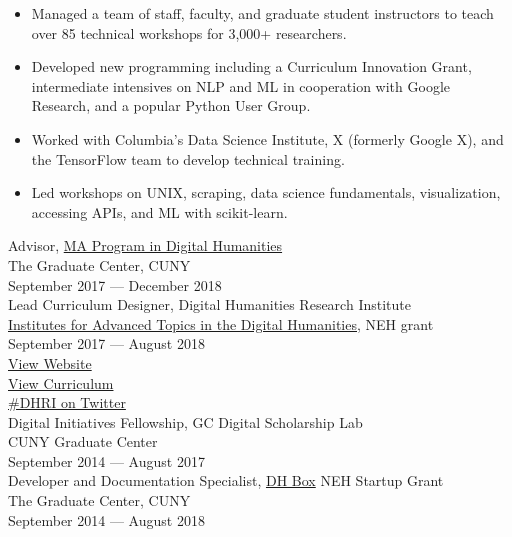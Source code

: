 \documentclass[11pt]{article}
\begin{document}
\begin{itemize}
\item Managed a team of staff, faculty, and graduate student instructors to teach over 85 technical workshops for 3,000+ researchers.\\[0pt]
\item Developed new programming including a Curriculum Innovation Grant, intermediate intensives on NLP and ML in cooperation with Google Research, and a popular Python User Group.\\[0pt]
\item Worked with Columbia's Data Science Institute, X (formerly Google X), and the TensorFlow team to develop technical training.\\[0pt]
\item Led workshops on UNIX, scraping, data science fundamentals, visualization, accessing APIs, and ML with scikit-learn.\\[0pt]
\end{itemize}

Advisor, \href{https://gc.cuny.edu/Page-Elements/Academics-Research-Centers-Initiatives/Masters-Programs/Digital-Humanities}{MA Program in Digital Humanities}\\[0pt]
The Graduate Center, CUNY\\[0pt]
September 2017 — December 2018\\[0pt]

Lead Curriculum Designer, Digital Humanities Research Institute\\[0pt]
\href{https://www.neh.gov/grants/odh/institutes-advanced-topics-in-the-digital-humanities}{Institutes for Advanced Topics in the Digital Humanities}, NEH grant\\[0pt]
September 2017 — August 2018\\[0pt]
\href{http://dhinstitutes.org}{View Website}\\[0pt]
\href{https://github.com/DHRI-Curriculum}{View Curriculum}\\[0pt]
\href{https://x.com/search?q=\%2523dhri\&src=tyah}{\#DHRI on Twitter}\\[0pt]

Digital Initiatives Fellowship, GC Digital Scholarship Lab\\[0pt]
CUNY Graduate Center\\[0pt]
September 2014 — August 2017\\[0pt]

Developer and Documentation Specialist, \href{https://dhbox.org/}{DH Box} NEH Startup Grant\\[0pt]
The Graduate Center, CUNY\\[0pt]
September 2014 — August 2018\\[0pt]
\end{document}
